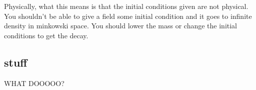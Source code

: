 \documentclass[11pt, oneside]{report}  %
\numberwithin{equation}{section}
\begin{document}
Physically, what this means is that the initial conditions given are not physical. You shouldn't be able to give a field some initial condition and it goes to infinite density in minkowski space. You should lower the mass or change the initial conditions to get the decay.



















\subsection{stuff}
WHAT DOOOOO?
\end{document}
